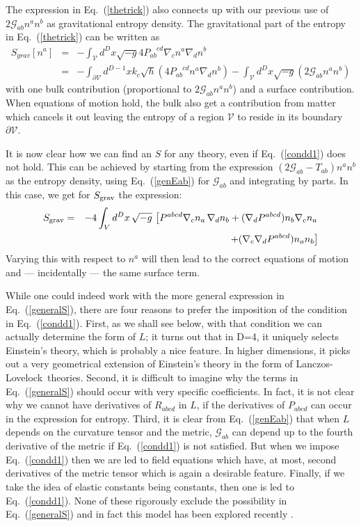 \documentclass[12pt]{iopart}
\def\eq#1{{Eq.~(\ref{#1})}}
\newcommand{\LL}{Lanczos-Lovelock}
\newcommand{\Cal}[1]{\ensuremath{\mathcal{#1}}}
\newcommand{\ph}[1]{\phantom{#1}}
\newcommand{\D}{\ensuremath{\nabla}}
\begin{document}
The expression in \eq{thetrick} also connects up with our previous use of $2\mathcal{G}_{ab}n^an^b$ as  gravitational entropy density. The gravitational part of the entropy in \eq{thetrick} can  be written as
\begin{eqnarray}
\label{thetrick1}
S_{grav}[n^a]&=&-\int_\Cal{V}{d^Dx\sqrt{-g}}4P_{ab}^{\ph{a}\ph{b}cd} \D_cn^a\D_dn^b\\
&=&-\int_{\partial\Cal{V}}{d^{D-1}x k_c\sqrt{h}}
(4P_{ab}^{\ph{a}\ph{b}cd} n^a\D_dn^b)
-\int_\Cal{V}{d^Dx\sqrt{-g}}(2\mathcal{G}_{ab}n^an^b)\nonumber
\end{eqnarray}
with one  bulk contribution (proportional to  $2\mathcal{G}_{ab}n^an^b$) and a surface contribution. When equations of motion hold, the bulk also get a contribution from matter which cancels it out leaving the entropy of a region $\Cal{V}$ to reside in its boundary  $\partial\Cal{V}$.

It is now clear how we can find  an $S$ for any theory, even if \eq{condd1} does not hold. 
This can be achieved by starting from  the expression  $(2\mathcal{G}_{ab}-T_{ab})n^an^b$ as the entropy density,  using \eq{genEab} for $\mathcal{G}_{ab}$ and integrating by parts. In this case, we get
for $S_{\rm grav}$ the expression:
\begin{eqnarray}
S_{\rm grav} &=& - 4 \int_V d^Dx\, \sqrt{-g}\, \left[ P^{abcd} \nabla_c n_a \, \nabla_d n_b + (\nabla_d P^{abcd})n_b \nabla_cn_a \right.\nonumber\\
&&\qquad \qquad \left. + (\nabla_c \nabla_dP^{abcd}) n_a n_b\right]
\label{generalS}
\end{eqnarray} 
Varying this with respect to $n^a$ will then lead to the correct equations of motion and --- incidentally --- the same surface term.


While one could indeed work with the more general expression in \eq{generalS}, there are four reasons to prefer the imposition of the condition in  \eq{condd1}.
First, as we shall see   below,  with that condition we can actually determine the form of $L$; it turns out that in D=4, it uniquely selects Einstein's theory, which  is probably a nice feature. In higher dimensions, it picks out a very geometrical extension of Einstein's theory in the form of \LL\ theories.
Second,
it is difficult to imagine why the terms in \eq{generalS} should occur with very specific coefficients. In fact, it is not clear  why we cannot have derivatives of $R_{abcd}$ in $L$, if the derivatives of $P_{abcd}$ can occur in the expression for entropy. 
Third, it is clear from \eq{genEab} that when $L$ depends on the curvature tensor and
the metric, $\mathcal{G}_{ab}$ can depend up to the fourth derivative of the metric if \eq{condd1}
is not satisfied. But when we impose \eq{condd1} then we are led to field equations
which have, at most, second derivatives of the metric tensor which is again a desirable feature.
Finally, if we take the idea of elastic constants being constants, then one is led to \eq{condd1}. 
None of these rigorously exclude the possibility in \eq{generalS} and in fact
this model has been
 explored  recently \cite{sfwu}.
 
\end{document}
